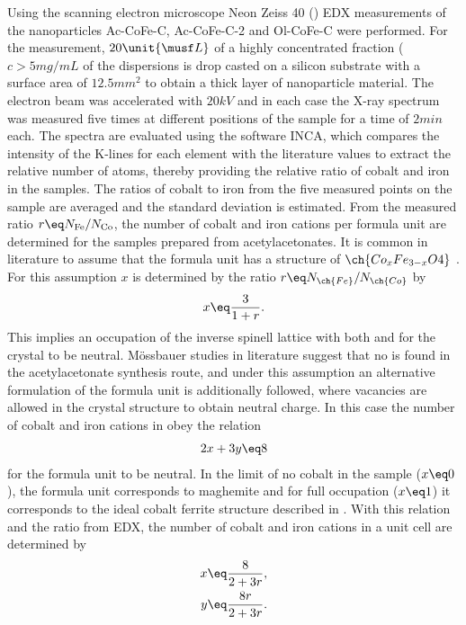 \documentclass[\main/dresen_thesis.tex]{subfiles}
\begin{document}
    Using the scanning electron microscope Neon Zeiss 40 () EDX measurements of the nanoparticles Ac-CoFe-C, Ac-CoFe-C-2 and Ol-CoFe-C were performed.
    For the measurement, $20 \unit{\musf L}$ of a highly concentrated fraction ($c > 5 \unit{mg/mL}$ of the dispersions is drop casted on a silicon substrate with a surface area of $12.5 \unit{mm^2}$ to obtain a thick layer of nanoparticle material.
    The electron beam was accelerated with $20 \unit{kV}$ and in each case the X-ray spectrum was measured five times at different positions of the sample for a time of $2 \unit{min}$ each.
    The spectra are evaluated using the software INCA, which compares the intensity of the K-lines for each element with the literature values to extract the relative number of atoms, thereby providing the relative ratio of cobalt and iron in the samples.
    The ratios of cobalt to iron from the five measured points on the sample are averaged and the standard deviation is estimated.
    From the measured ratio $r \eq N_\mathrm{Fe} / N_\mathrm{Co}$, the number of cobalt and iron cations per formula unit are determined for the samples prepared from acetylacetonates.
    It is common in literature to assume that the formula unit has a structure of $\ch{Co_x Fe_{3-x} O4}$ \cite{Wu_2014_Monol, Sathya_2016_Cofeo}.
    For this assumption $x$ is determined by the ratio $r \eq N_{\ch{Fe}} / N_{\ch{Co}}$ by
    \begin{align}
      x \eq \frac{3}{1 + r}.
    \end{align}
    This implies an occupation of the inverse spinell lattice with both  and  for the crystal to be neutral.
    M\"ossbauer studies in literature suggest that no  is found in the acetylacetonate synthesis route, and under this assumption an alternative formulation of the formula unit is additionally followed, where vacancies are allowed in the crystal structure to obtain neutral charge.
    In this case the number of cobalt and iron cations in  obey the relation
    \begin{align}
      2 x + 3 y \eq 8
    \end{align}
    for the formula unit to be neutral.
    In the limit of no cobalt in the sample ($x \eq 0$), the formula unit corresponds to maghemite and for full occupation ($x \eq 1$) it corresponds to the ideal cobalt ferrite structure described in .
    With this relation and the ratio from EDX, the number of cobalt and iron cations in a unit cell are determined by
    \begin{align}
      x \eq \frac{8}{2 + 3r},\\
      y \eq \frac{8r}{2 + 3r}.
    \end{align}
\end{document}
